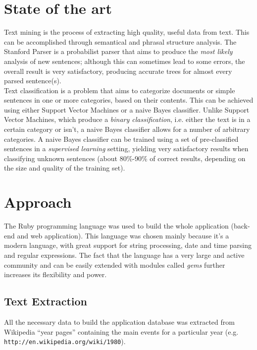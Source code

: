 \documentclass{llncs}
\begin{document}
\section{State of the art}

Text mining is the process of extracting high quality, useful data from text. This can be accomplished through semantical and phrasal structure analysis. The Stanford Parser is a probabilist parser that aims to produce the \textit{most likely} analysis of new sentences; although this can sometimes lead to some errors, the overall result is very satisfactory, producing accurate trees for almost every parsed sentence(s).\\

Text classification is a problem that aims to categorize documents or simple sentences in one or more categories, based on their contents. This can be achieved using either Support Vector Machines or a naive Bayes classifier. Unlike Support Vector Machines, which produce a \textit{binary classification}, i.e. either the text is in a certain category or isn't, a naive Bayes classifier allows for a number of arbitrary categories. A naive Bayes classifier can be trained using a set of pre-classified sentences in a \textit{supervised learning} setting, yielding very satisfactory results when classifying unknown sentences (about 80\%-90\% of correct results, depending on the size and quality of the training set).\cite{russel}

\section{Approach}
\label{sec:approach}

The Ruby programming language was used to build the whole application (back-end and web application). This language was chosen mainly because it's a modern language, with great support for string processing, date and time parsing and regular expressions. The fact that the language has a very large and active community and can be easily extended with modules called \textit{gems} further increases its flexibility and power.

\subsection{Text Extraction}

All the necessary data to build the application database was extracted from Wikipedia ``year pages'' containing the main events for a particular year (e.g. \verb!http://en.wikipedia.org/wiki/1980!).\\
\end{document}
